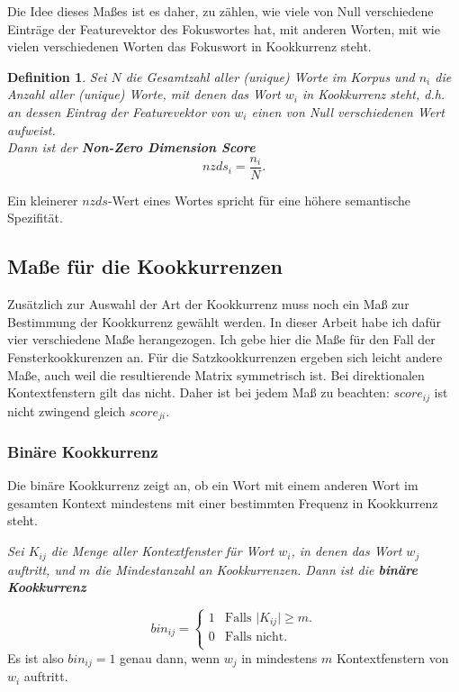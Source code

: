 \documentclass[11pt,numbers=noenddot]{scrartcl}
\newtheorem*{defi}{Definition}
\begin{document}
Die Idee dieses Maßes ist es daher, zu zählen, wie viele von Null verschiedene Einträge der Featurevektor des Fokuswortes hat, mit anderen Worten, mit wie vielen verschiedenen Worten das Fokuswort in Kookkurrenz steht.

\begin{defi}
Sei $N$ die Gesamtzahl aller (unique) Worte im Korpus und $n_i$ die Anzahl aller (unique) Worte, mit denen das Wort $w_i$ in Kookkurrenz steht, d.h. an dessen Eintrag der Featurevektor von $w_i$ einen von Null verschiedenen Wert aufweist. \\ Dann ist der \textbf{Non-Zero Dimension Score}
\begin{equation}
    nzds_i = \frac{n_i}{N}.
\end{equation}
\end{defi}

Ein kleinerer $nzds$-Wert eines Wortes spricht für eine höhere semantische Spezifität.

\subsection{Maße für die Kookkurrenzen} \label{coocmeasures}

Zusätzlich zur Auswahl der Art der Kookkurrenz muss noch ein Maß zur Bestimmung der Kookkurrenz gewählt werden. In dieser Arbeit habe ich dafür vier verschiedene Maße herangezogen. Ich gebe hier die Maße für den Fall der Fensterkookkurenzen an. Für die Satzkookkurrenzen ergeben sich leicht andere Maße, auch weil die resultierende Matrix symmetrisch ist. Bei direktionalen Kontextfenstern gilt das nicht. Daher ist bei jedem Maß zu beachten: $score_{ij}$ ist nicht zwingend gleich $score_{ji}$.

\subsubsection{Binäre Kookkurrenz} \label{bin}

Die binäre Kookkurrenz zeigt an, ob ein Wort mit einem anderen Wort im gesamten Kontext mindestens mit einer bestimmten Frequenz in Kookkurrenz steht.

\emph{Sei $K_{ij}$ die Menge aller Kontextfenster für Wort $w_i$, in denen das Wort $w_j$ auftritt, und $m$ die Mindestanzahl an Kookkurrenzen. Dann ist die \textbf{binäre Kookkurrenz}}

\begin{equation*}
   bin_{ij} =
   \begin{cases}
        1 & \text{Falls |$K_{ij}| \ge m$.}\\
        0 & \text{Falls nicht.}\\
   \end{cases}
\end{equation*}
Es ist also $bin_{ij} = 1$ genau dann, wenn $w_j$ in mindestens $m$ Kontextfenstern von $w_i$ auftritt.
\end{document}
